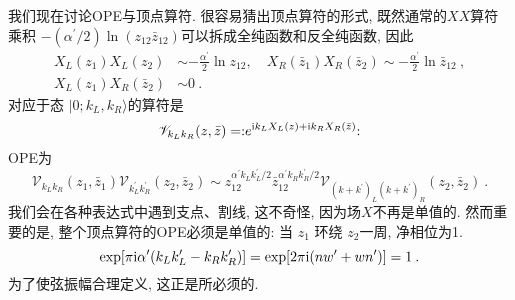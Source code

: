 我们现在讨论OPE与顶点算符. 很容易猜出顶点算符的形式, 既然通常的$XX$算符乘积 $-(\alpha^{\prime} / 2) \ln (z_{12} \bar{z}_{12})$可以拆成全纯函数和反全纯函数, 因此
\begin{subequations} \label{8.2.17}
\begin{align}
X_{L}(z_{1}) X_{L}(z_{2}) &\sim-\frac{\alpha^{\prime}}{2} \ln z_{12}, \quad 
X_{R}(\bar{z}_{1}) X_{R}(\bar{z}_{2}) \sim-\frac{\alpha^{\prime}}{2} \ln \bar{z}_{12}  \:,  \label{8.2.17a} \\
X_{L}(z_{1}) X_{R}(\bar{z}_{2}) &\sim 0 \:. \label{8.2.17b}
\end{align}		
\end{subequations}
对应于态 $|0 ; k_{L}, k_{R}\rangle$的算符是
\begin{equation}
	\mathscr{V}_{k_{L} k_{R}}(z, \bar{z}) = : \mathrel{e^{\mathrm{i} k_{L} X_{L}(z)+ \mathrm{i} k_{R} X_{R}(\bar{z})}}: \label{8.2.18}
\end{equation}
OPE为
\begin{equation}
	\mathscr{V}_{k_{L} k_{R}}(z_{1}, \bar{z}_{1}) \mathscr{V}_{k_{L}^{\prime} k_{R}^{\prime}}(z_{2}, \bar{z}_{2}) \sim 
	z_{12}^{\alpha^{\prime} k_{L} k_{L}^{\prime} / 2} \bar{z}_{12}^{\alpha^{\prime} k_{R} k_{R}^{\prime} / 2} 
	\mathscr{V}_{(k+k^{\prime})_{L}(k+k^{\prime})_{R}}(z_{2}, \bar{z}_{2}) \:. \label{8.2.19}
\end{equation}
我们会在各种表达式中遇到支点、割线, 这不奇怪, 因为场$X$不再是单值的. 然而重要的是, 整个顶点算符的OPE必须是单值的: 当 $z_{1}$ 环绕 $z_{2}$一周, 净相位为1.
\begin{equation}
	\exp [\pi \mathrm{i} \alpha^{\prime}(k_{L} k_{L}^{\prime}-k_{R} k_{R}^{\prime})]
	=\exp [2 \pi \mathrm{i}(n w^{\prime}+w n^{\prime})]=1 \:. \label{8.2.20}
\end{equation}
为了使弦振幅合理定义, 这正是所必须的.



